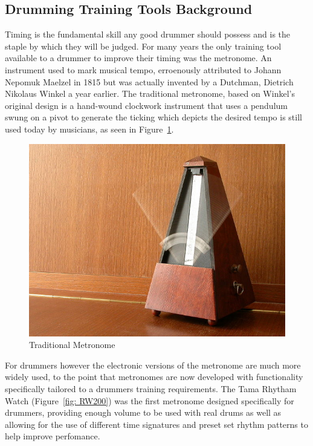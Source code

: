 \documentclass[a4paper, 11pt]{article}
\begin{document}
\subsection{Drumming Training Tools Background}
Timing is the fundamental skill any good drummer should possess and is the staple by which they will be judged. For many years the only training tool available to a drummer to improve their timing was the metronome. An instrument used to mark musical tempo, erroenously attributed to Johann Nepomuk Maelzel in 1815 but was actually invented by a Dutchman, Dietrich Nikolaus Winkel a year earlier. The traditional metronome, based on Winkel's original design is a hand-wound clockwork instrument that uses a pendulum swung on a pivot to generate the ticking which depicts the desired tempo \cite{brit-metro} is still used today by musicians, as seen in Figure~\ref{fig: TradMet}. \par

\begin{figure}[ht]
	\centering
	\includegraphics[scale=0.30]{TradMet}
	\caption{Traditional Metronome}%
	\label{fig: TradMet}
\end{figure}

For drummers however the electronic versions of the metronome are much more widely used, to the point that metronomes are now developed with functionality specifically tailored to a drummers training requirements. The Tama Rhytham Watch (Figure~\ref{fig: RW200}) was the first metronome designed specifically for drummers, providing enough volume to be used with real drums as well as allowing for the use of different time signatures and preset set rhythm patterns to help improve perfomance.\par
\clearpage
\end{document}

